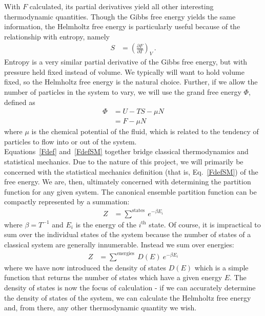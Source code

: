 \documentclass[12pt]{article}
\begin{document}
With $F$ calculated, its partial derivatives yield all other interesting thermodynamic quantities. Though the Gibbs free energy yields the same information, the Helmholtz free energy is particularly useful because of the relationship with entropy, namely
\begin{align}
    S &= \left(\frac{\partial F}{\partial T}\right)_{V}\, .
\end{align}
Entropy is a very similar partial derivative of the Gibbs free energy, but with pressure held fixed instead of volume. We typically will want to hold volume fixed, so the Helmholtz free energy is the natural choice. Further, if we allow the number of particles in the system to vary, we will use the grand free energy $\Phi$, defined as
\begin{align}
    \Phi &= U-TS-\mu N\\
    &= F - \mu N
    \label{Phidef}
\end{align}
where $\mu$ is the chemical potential of the fluid, which is related to the tendency of particles to flow into or out of the system.\\

Equations~\ref{Fdef} and~\ref{FdefSM} together bridge classical thermodynamics and statistical mechanics. Due to the nature of this project, we will primarily be concerned with the statistical mechanics definition (that is, Eq.~\ref{FdefSM}) of the free energy. We are, then, ultimately concerned with determining the partition function for any given system. The canonical ensemble partition function can be compactly represented by a summation:
\begin{align}
    Z &= \sum^{\text{states}}~e^{-\beta E_i}
\end{align}
where $\beta =  T^{-1}$ and $E_i$ is the energy of the $i^{\text{th}}$ state. Of course, it is impractical to sum over the individual states of the system because the number of states of a classical system are generally innumerable. Instead we sum over energies:
\begin{align}
    Z &= \sum^{\text{energies}}~D(E)~e^{-\beta E_i}
\end{align}
where we have now introduced the density of states $D(E)$ which is a simple function that returns the number of states which have a given energy $E$. The density of states is now the focus of calculation - if we can accurately determine the density of states of the system, we can calculate the Helmholtz free energy and, from there, any other thermodynamic quantity we wish. \\  
\end{document}
